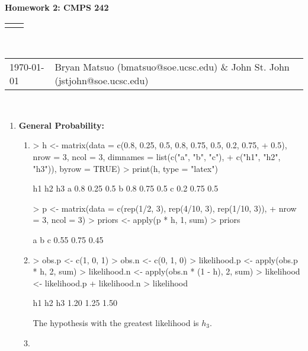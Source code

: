 \documentclass[12pt]{article}
\renewcommand{\title}[1]{\textbf{#1}\\}
\renewcommand{\line}{\begin{tabularx}{\textwidth}{X>{\raggedleft}X}\hline\\\end{tabularx}\\[-0.5cm]}
\newcommand{\leftright}[2]{\begin{tabularx}{\textwidth}{X>{\raggedleft}X}#1%
& #2\\\end{tabularx}\\[-0.5cm]}
\begin{document}
\title{Homework 2: CMPS 242}
\line
\leftright{\today}{Bryan Matsuo (bmatsuo@soe.ucsc.edu) \& John St. John (jstjohn@soe.ucsc.edu)} %
\begin{enumerate}
\item \textbf{General Probability: }

\begin{enumerate}
\item 
\begin{Schunk}
\begin{Sinput}
> h <- matrix(data = c(0.8, 0.25, 0.5, 0.8, 0.75, 0.5, 0.2, 0.75, 
+     0.5), nrow = 3, ncol = 3, dimnames = list(c("a", "b", "c"), 
+     c("h1", "h2", "h3")), byrow = TRUE)
> print(h, type = "latex")
\end{Sinput}
\begin{Soutput}
   h1   h2  h3
a 0.8 0.25 0.5
b 0.8 0.75 0.5
c 0.2 0.75 0.5
\end{Soutput}
\begin{Sinput}
> p <- matrix(data = c(rep(1/2, 3), rep(4/10, 3), rep(1/10, 3)), 
+     nrow = 3, ncol = 3)
> priors <- apply(p * h, 1, sum)
> priors
\end{Sinput}
\begin{Soutput}
   a    b    c 
0.55 0.75 0.45 
\end{Soutput}
\end{Schunk}
\item
\begin{Schunk}
\begin{Sinput}
> obs.p <- c(1, 0, 1)
> obs.n <- c(0, 1, 0)
> likelihood.p <- apply(obs.p * h, 2, sum)
> likelihood.n <- apply(obs.n * (1 - h), 2, sum)
> likelihood <- likelihood.p + likelihood.n
> likelihood
\end{Sinput}
\begin{Soutput}
  h1   h2   h3 
1.20 1.25 1.50 
\end{Soutput}
\end{Schunk}
The hypothesis with the greatest likelihood is $h_3$.
\item


\end{enumerate}
\end{enumerate}
\end{document}
